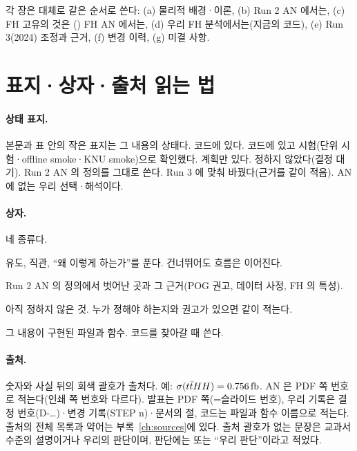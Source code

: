 각 장은 대체로 같은 순서로 쓴다: (a) 물리적 배경·이론, (b) Run 2 \ttHH{} AN 에서는, (c) FH 고유의 것은 \ttH(\bbbar) FH AN 에서는,
(d) 우리 FH 분석에서는(지금의 코드), (e) Run 3(2024) 조정과 근거, (f) 변경 이력, (g) 미결 사항.

\section{표지·상자·출처 읽는 법}\label{sec:about-legend}

\paragraph{상태 표지.} 본문과 표 안의 작은 표지는 그 내용의 상태다.
\tagimpl{} 코드에 있다.\enspace
\tagtest{} 코드에 있고 시험(단위 시험·offline smoke·KNU smoke)으로 확인했다.\enspace
\tagplan{} 계획만 있다.\enspace
\tagopen{} 정하지 않았다(결정 대기).\enspace
\tagan{} Run 2 AN 의 정의를 그대로 쓴다.\enspace
\tagrunthree{} Run 3 에 맞춰 바꿨다(근거를 같이 적음).\enspace
\tagours{} AN 에 없는 우리 선택·해석이다.

\paragraph{상자.} 네 종류다.
\begin{note}[이해를 위한 설명]
유도, 직관, ``왜 이렇게 하는가''를 푼다. 건너뛰어도 흐름은 이어진다.
\end{note}
\begin{andiff}
Run 2 AN 의 정의에서 벗어난 곳과 그 근거(POG 권고, 데이터 사정, FH 의 특성).
\end{andiff}
\begin{openq}
아직 정하지 않은 것. 누가 정해야 하는지와 권고가 있으면 같이 적는다.
\end{openq}
\begin{impl}
그 내용이 구현된 파일과 함수. 코드를 찾아갈 때 쓴다.
\end{impl}

\paragraph{출처.} 숫자와 사실 뒤의 회색 괄호가 출처다. 예: $\sigma(t\bar{t}HH)=0.756\,\mathrm{fb}$.
AN 은 PDF 쪽 번호로 적는다(인쇄 쪽 번호와 다르다). 발표는 PDF 쪽(=슬라이드 번호), 우리 기록은 결정 번호(D-…)·변경 기록(STEP n)·문서의 절,
코드는 파일과 함수 이름으로 적는다. 출처의 전체 목록과 약어는 부록~\ref{ch:sources}에 있다. 출처 괄호가 없는 문장은 교과서 수준의 설명이거나
우리의 판단이며, 판단에는 \tagours{} 또는 ``우리 판단''이라고 적었다.

